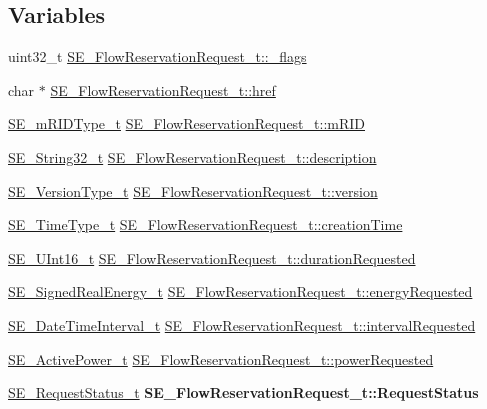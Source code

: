 \subsection*{Variables}
\begin{DoxyCompactItemize}
\item 
uint32\+\_\+t \hyperlink{group__FlowReservationRequest_ga0764d897ff608d7dbad85a6cb7aa89ba}{S\+E\+\_\+\+Flow\+Reservation\+Request\+\_\+t\+::\+\_\+flags}
\item 
char $\ast$ \hyperlink{group__FlowReservationRequest_ga26db6aba32274d08e0038686ec6ae177}{S\+E\+\_\+\+Flow\+Reservation\+Request\+\_\+t\+::href}
\item 
\hyperlink{group__mRIDType_gac74622112f3a388a2851b2289963ba5e}{S\+E\+\_\+m\+R\+I\+D\+Type\+\_\+t} \hyperlink{group__FlowReservationRequest_ga71989250ddc7ef28b356f8bc3cba85a1}{S\+E\+\_\+\+Flow\+Reservation\+Request\+\_\+t\+::m\+R\+ID}
\item 
\hyperlink{group__String32_gac9f59b06b168b4d2e0d45ed41699af42}{S\+E\+\_\+\+String32\+\_\+t} \hyperlink{group__FlowReservationRequest_gaa9f88864ccfb91a42dfd5f4961d69831}{S\+E\+\_\+\+Flow\+Reservation\+Request\+\_\+t\+::description}
\item 
\hyperlink{group__VersionType_ga4b8d27838226948397ed99f67d46e2ae}{S\+E\+\_\+\+Version\+Type\+\_\+t} \hyperlink{group__FlowReservationRequest_gad473a8896b755ebbeea7993abb91648e}{S\+E\+\_\+\+Flow\+Reservation\+Request\+\_\+t\+::version}
\item 
\hyperlink{group__TimeType_ga6fba87a5b57829b4ff3f0e7638156682}{S\+E\+\_\+\+Time\+Type\+\_\+t} \hyperlink{group__FlowReservationRequest_ga102e894f5430b9982cb9a6b8812a82eb}{S\+E\+\_\+\+Flow\+Reservation\+Request\+\_\+t\+::creation\+Time}
\item 
\hyperlink{group__UInt16_gac68d541f189538bfd30cfaa712d20d29}{S\+E\+\_\+\+U\+Int16\+\_\+t} \hyperlink{group__FlowReservationRequest_gae84ba3c66b07ed3f5b9e567893c0796a}{S\+E\+\_\+\+Flow\+Reservation\+Request\+\_\+t\+::duration\+Requested}
\item 
\hyperlink{structSE__SignedRealEnergy__t}{S\+E\+\_\+\+Signed\+Real\+Energy\+\_\+t} \hyperlink{group__FlowReservationRequest_ga02b7ef2f402468e92c66728984b2b0c8}{S\+E\+\_\+\+Flow\+Reservation\+Request\+\_\+t\+::energy\+Requested}
\item 
\hyperlink{structSE__DateTimeInterval__t}{S\+E\+\_\+\+Date\+Time\+Interval\+\_\+t} \hyperlink{group__FlowReservationRequest_gaae530fc46e3436602dbeb1d39b07b097}{S\+E\+\_\+\+Flow\+Reservation\+Request\+\_\+t\+::interval\+Requested}
\item 
\hyperlink{structSE__ActivePower__t}{S\+E\+\_\+\+Active\+Power\+\_\+t} \hyperlink{group__FlowReservationRequest_ga607d366d123a4f21005c78a04f1739f4}{S\+E\+\_\+\+Flow\+Reservation\+Request\+\_\+t\+::power\+Requested}
\item 
\mbox{\label{group__FlowReservationRequest_gaeb38c97f64714ed6b27f6097a85a6d4f}} 
\hyperlink{structSE__RequestStatus__t}{S\+E\+\_\+\+Request\+Status\+\_\+t} {\bfseries S\+E\+\_\+\+Flow\+Reservation\+Request\+\_\+t\+::\+Request\+Status}
\end{DoxyCompactItemize}


